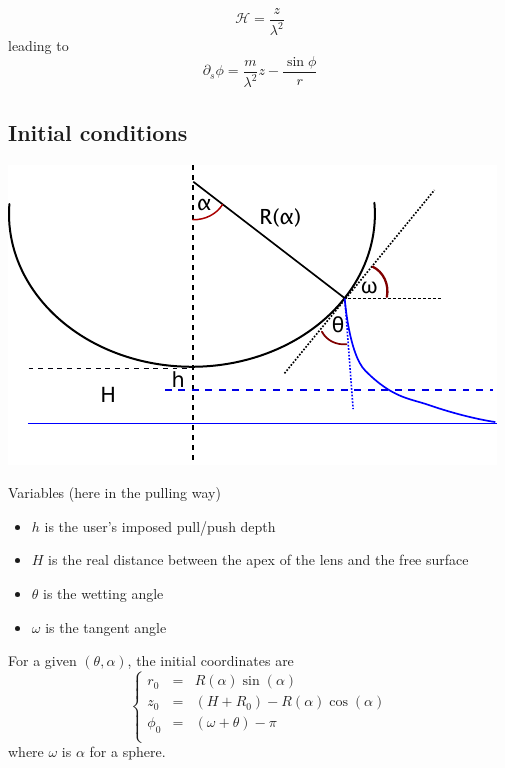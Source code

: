 \documentclass[aps,onecolumn]{revtex4}
\begin{document}
\begin{equation}
	\mathcal{H} = \dfrac{z}{\lambda^2}
\end{equation}
leading to
\begin{equation}
	\partial_s \phi = \dfrac{m}{\lambda^2} z  - \dfrac{\sin\phi}{r}
\end{equation}


\subsection{Initial conditions}

\begin{center}
\includegraphics{pull.pdf}
\end{center}

Variables (here in the pulling way)
\begin{itemize}
	\item $h$ is the user's imposed pull/push depth
	\item $H$ is the real distance between the apex of the lens and the free surface
	\item $\theta$ is the wetting angle
	\item $\omega$ is the tangent angle
\end{itemize}

For a given $(\theta,\alpha)$, the initial coordinates are
\begin{equation}
\left\lbrace
\begin{array}{rcl}
	r_0    & = & R(\alpha) \sin(\alpha)\\
	z_0    & = & (H + R_0) - R(\alpha) \cos(\alpha)\\
	\phi_0 & = & \left(\omega + \theta\right) - \pi\\
\end{array}
\right. 
\end{equation}
where $\omega$ is $\alpha$ for a sphere.\\
\end{document}

